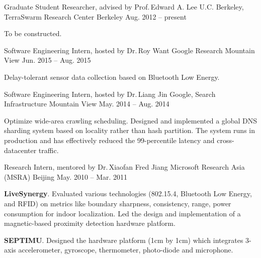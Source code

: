 
\begin{cventries}

  \cventry
  {Graduate Student Researcher, advised by Prof.\,Edward A. Lee}
  {U.C. Berkeley, TerraSwarm Research Center}
  {Berkeley}
  {Aug. 2012 -- present}
  {
    \begin{cvitems}
    \item {To be constructed.}
    \end{cvitems}
  }

  \cventry
  {Software Engineering Intern, hosted by Dr.\,Roy Want}
  {Google Research}
  {Mountain View}
  {Jun. 2015 -- Aug. 2015}
  {
    \begin{cvitems}
      Delay-tolerant sensor data collection based on Bluetooth Low Energy.
    \end{cvitems}
  }

  \cventry
  {Software Engineering Intern, hosted by Dr.\,Liang Jin}
  {Google, Search Infrastructure}
  {Mountain View}
  {May. 2014 -- Aug. 2014}
  {
    \begin{cvitems}
      Optimize wide-area crawling scheduling. Designed and implemented a global
      DNS sharding system based on locality rather than hash partition. The
      system runs in production and has effectively reduced the 99-percentile
      latency and cross-datacenter traffic.
    \end{cvitems}
  }

  \cventry
  {Research Intern, mentored by Dr.\,Xiaofan Fred Jiang}
  {Microsoft Research Asia (MSRA)}
  {Beijing}
  {May. 2010 -- Mar. 2011}
  {
    \begin{cvitems}
      \item \textbf{LiveSynergy}. Evaluated various technologies (802.15.4, Bluetooth
      Low Energy, and RFID) on metrics like boundary sharpness, consistency,
      range, power consumption for indoor localization. Led the design and
      implementation of a magnetic-based proximity detection hardware platform.
      \item \textbf{SEPTIMU}. Designed the hardware platform (1cm by 1cm) which
      integrates 3-axis accelerometer, gyroscope, thermometer, photo-diode and
      microphone.
    \end{cvitems}
  }
  
\end{cventries}

